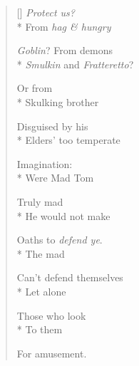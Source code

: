 \label{ch:lear_aq}
\settowidth{\versewidth}{Smulkin and Fratteretto?}
\begin{verse}[\versewidth]
 \textit{Protect us?}\\*
From \textit{hag \& hungry}

\textit{Goblin}? From demons\\*
\textit{Smulkin} and \textit{Fratteretto}?

Or from\\*
Skulking brother

Disguised by his\\*
Elders' too temperate

Imagination:\\*
Were Mad Tom

Truly mad\\*
He would not make

Oaths to \textit{defend ye}.\\*
The mad

Can't defend themselves\\*
Let alone

Those who look\\*
To them

For amusement.
\end{verse}

